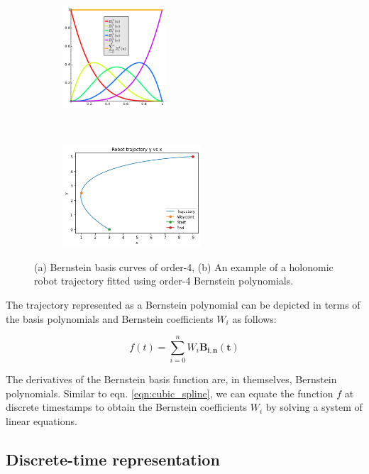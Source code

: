 \begin{figure}[t!]
    \centering
    \begin{subfigure}[t]{0.4\textwidth}
        \centering
        \includegraphics[height=1.5in]{figures/background/Bernstein_curves.png}
    \end{subfigure}%
    ~ 
    \begin{subfigure}[t]{0.5\textwidth}
        \centering
        \includegraphics[height=1.5in]{figures/background/holonomic_Bernstein.png}
    \end{subfigure}
    \caption[Bernstein curves and trajectory]{(a) Bernstein basis curves of order-4, (b) An example of a holonomic robot trajectory fitted using order-4 Bernstein polynomials.}
    \label{fig:Bernstein_curv}
\end{figure}

The trajectory represented as a Bernstein polynomial can be depicted in terms of the basis polynomials and Bernstein coefficients $W_i$ as follows:

\begin{equation}
    f(t) = \sum_{i=0}^{n}W_i \boldsymbol{B_{i,n}(t)}
    \label{eqn:Bernstein}
\end{equation}

The derivatives of the Bernstein basis function are, in themselves, Bernstein polynomials\cite{bernstein_gen}. Similar to eqn. \ref{eqn:cubic_spline}, we can equate the function $f$ at discrete timestamps to obtain the Bernstein coefficients $W_i$ by solving a system of linear equations.

\subsection{Discrete-time representation}

